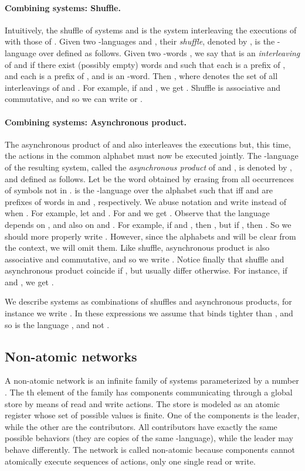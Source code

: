 \documentclass{llncs}
\begin{document}
\paragraph{Combining systems: Shuffle.} Intuitively, the shuffle of systems  and  is the system
interleaving the executions of  with those of . 
Given two -languages  and 
, their \emph{shuffle}, denoted by , 
is the -language over  defined as 
follows.
Given two -words , we say that  
is an \emph{interleaving} of  and  if there exist (possibly empty) words 
 and  such that 
each  is a prefix of ,
and each  is a prefix of ,
and  is an -word.
Then , where  denotes the set of all interleavings of  and
.  For  example, if  and , we get . 
Shuffle is associative and commutative, and so we can 
write  or .



\paragraph{Combining systems: Asynchronous product.} The asynchronous product of  and  also interleaves the executions but, this time,
the actions in the common alphabet must now be executed jointly.
The -language of the resulting system, called the \emph{asynchronous
product} of  and , is denoted by , and
defined as follows.  Let  be the word obtained by erasing
from  all occurrences of symbols not in .  is the -language over the alphabet
 such that  if{}f
 and  are prefixes of words in
 and , respectively. 
We abuse notation and write 
instead of  when .  For example, let
 and .  For 
and  we get . 
Observe that the language  depends on ,  and
also on  and . For example, if  and
, then , but if , then .  So we should more properly write
. However, since the alphabets
 and  will be clear from the context, we will omit
them. 
Like shuffle, asynchronous product is also associative and commutative, and so we write . Notice finally that
shuffle and asynchronous product coincide if , but usually differ otherwise. For instance, if  and , we get . 

We describe systems as combinations of shuffles and asynchronous products, for instance
we write . In these expressions we
assume that  binds tighter than , and so
 is the language ,
and not .


\subsection{Non-atomic networks}
\label{subsec:na-networks}
A non-atomic network is an infinite family of systems parameterized by a number
.  The th element of the family has  components communicating
through a global store by means of read and write actions.  The store is
modeled as an atomic register whose set of possible values is finite.  One
of the  components is the leader, while the other  are the
contributors. All contributors have exactly the same possible behaviors (they
are copies of the same -language), while the leader may behave
differently. The network is called non-atomic because components cannot
atomically execute sequences of actions, only one single read or write.
\end{document}
